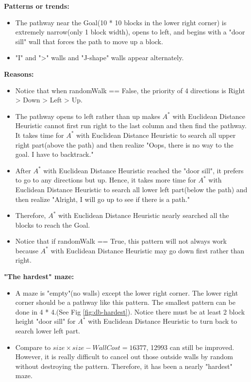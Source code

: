 \documentclass[letter]{article}
\begin{document}
\begin{enumerate}[resume]
\begin{enumerate}
\begin{enumerate}
				\textbf{Patterns or trends:} 
				\begin{itemize}
					\item {The pathway near the Goal(10 * 10 blocks in the lower right corner) is extremely narrow(only 1 block width), opens to left, and begins with a "door sill" wall that forces the path to move up a block.}
					
					\item {"I" and ">" walls and "J-shape" walls appear alternately.}
				\end{itemize}
				
				\textbf{Reasons:} 
				\begin{itemize}
					\item {Notice that when randomWalk == False, the priority of 4 directions is Right > Down > Left > Up.}
					\item {The pathway opens to left rather than up makes $ A^* $ with Euclidean Distance Heuristic cannot first run right to the last column and then find the pathway. It takes time for $ A^* $ with Euclidean Distance Heuristic to search all upper right part(above the path) and then realize "Oops, there is no way to the goal. I have to backtrack."}
					\item {After $ A^* $ with Euclidean Distance Heuristic reached the "door sill", it prefers to go to any directions but up. Hence, it takes more time for $ A^* $ with Euclidean Distance Heuristic to search all lower left part(below the path) and then realize "Alright, I will go up to see if there is a path."}
					\item {Therefore, $ A^* $ with Euclidean Distance Heuristic nearly searched all the blocks to reach the Goal.}
					\item {Notice that if randomWalk == True, this pattern will not always work because $ A^* $ with Euclidean Distance Heuristic may go down first rather than right.}
				\end{itemize}
				
				\textbf{"The hardest" maze:} 
				\begin{itemize}
					\item {A maze is "empty"(no walls) except the lower right corner. The lower right corner should be a pathway like this pattern. The smallest pattern can be done in 4 * 4.(See Fig \ref{fig:db-hardest}). Notice there must be at least 2 block height "door sill" for $ A^* $ with Euclidean Distance Heuristic to turn back to search lower left part. }
					\item {Compare to $size \times size - WallCost =16377$, 12993 can still be improved. However, it is really difficult to cancel out those outside walls by random without destroying the pattern. Therefore, it has been a nearly "hardest" maze.}
				\end{itemize}
				

\end{enumerate}
\end{enumerate}
\end{enumerate}
\end{document}
